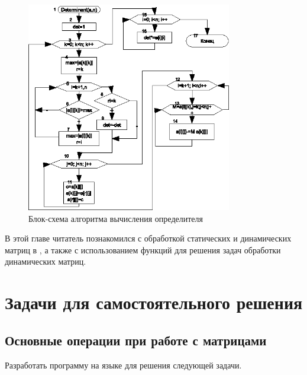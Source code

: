 \begin{figure}[htb]
\begin{center}
\includegraphics[width=0.8\textwidth]{img/ris_6_17}
\caption{Блок-схема алгоритма вычисления определителя}
\label{ch06:refDrawing16}
\end{center}
\end{figure}

В этой главе читатель познакомился с обработкой статических и динамических матриц в , а также с использованием
функций для решения задач обработки динамических матриц. 

\section[Задачи для самостоятельного решения]{Задачи для самостоятельного решения}
\subsection[Основные операции при работе с матрицами]{Основные операции при работе с матрицами}
Разработать программу на языке  для решения следующей задачи.

